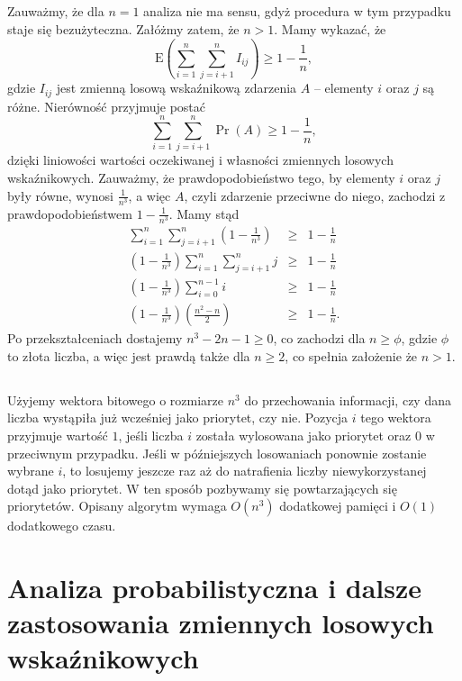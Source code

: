 \subsection{} %
Zauważmy, że dla $n=1$ analiza nie ma sensu, gdyż procedura  w tym przypadku staje się bezużyteczna. Załóżmy zatem, że $n>1$. Mamy wykazać, że
\[
	\mathrm{E}\left(\sum_{i=1}^n\sum_{j=i+1}^nI_{ij}\right) \ge 1-\frac{1}{n},
\]
gdzie $I_{ij}$ jest zmienną losową wskaźnikową zdarzenia $A$ -- elementy $i$ oraz $j$ są różne. Nierówność przyjmuje postać
\[
	\sum_{i=1}^n\sum_{j=i+1}^n\Pr(A)\ge 1-\frac{1}{n},
\]
dzięki liniowości wartości oczekiwanej i własności zmiennych losowych wskaźnikowych. Zauważmy, że prawdopodobieństwo tego, by elementy $i$ oraz $j$ były równe, wynosi $\frac{1}{n^3}$, a więc $A$, czyli zdarzenie przeciwne do niego, zachodzi z prawdopodobieństwem $1-\frac{1}{n^3}$. Mamy stąd
\begin{eqnarray*}
	\sum_{i=1}^n\sum_{j=i+1}^n\left(1-\frac{1}{n^3}\right) &\ge& 1-\frac{1}{n} \\
	\left(1-\frac{1}{n^3}\right)\sum_{i=1}^n\sum_{j=i+1}^nj &\ge& 1-\frac{1}{n} \\
	\left(1-\frac{1}{n^3}\right)\sum_{i=0}^{n-1}i &\ge& 1-\frac{1}{n} \\
	\left(1-\frac{1}{n^3}\right)\left(\frac{n^2-n}{2}\right) &\ge& 1-\frac{1}{n}.
\end{eqnarray*}
Po przekształceniach dostajemy $n^3-2n-1\ge 0$, co zachodzi dla $n\ge\phi$, gdzie $\phi$ to złota liczba, a więc jest prawdą także dla $n\ge 2$, co spełnia założenie że $n>1$.

\subsection{} %
Użyjemy wektora bitowego o rozmiarze $n^3$ do przechowania informacji, czy dana liczba wystąpiła już wcześniej jako priorytet, czy nie. Pozycja $i$ tego wektora przyjmuje wartość $1$, jeśli liczba $i$ została wylosowana jako priorytet oraz $0$ w przeciwnym przypadku. Jeśli w późniejszych losowaniach ponownie zostanie wybrane $i$, to losujemy jeszcze raz aż do natrafienia liczby niewykorzystanej dotąd jako priorytet. W ten sposób pozbywamy się powtarzających się priorytetów. Opisany algorytm wymaga $O(n^3)$ dodatkowej pamięci i $O(1)$ dodatkowego czasu.

\section{Analiza probabilistyczna i dalsze zastosowania zmiennych losowych wskaźnikowych}

